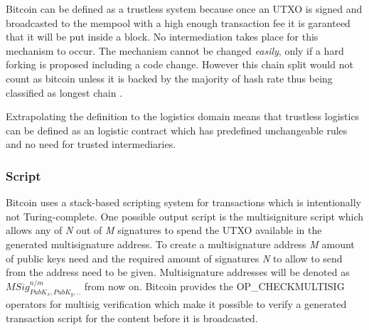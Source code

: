 Bitcoin can be defined as a trustless system because once an UTXO is signed and broadcasted to the mempool with a high enough transaction fee it is garanteed that it will be put inside a block. No intermediation takes place for this mechanism to occur. The mechanism cannot be changed \textit{easily}, only if a hard forking is proposed including a code change. However this chain split would not count as bitcoin unless it is backed by the majority of hash rate thus being classified as longest chain \cite{nakamoto2008bitcoin}. \par
Extrapolating the definition to the logistics domain means that trustless logistics can be defined as an logistic contract which has predefined unchangeable rules and no need for trusted intermediaries.

\subsubsection{Script}

Bitcoin uses a stack-based scripting system for transactions which is intentionally not Turing-complete. One possible output script is the multisigniture script which allows any of \textit{N} out of \textit{M} signatures to spend the UTXO available in the generated multisignature address. To create a multisignature address \textit{M} amount of public keys need and the required amount of signatures \textit{N} to allow to send from the address need to be given. Multisignature addresses will be denoted as \(MSig_{PubK_x, PubK_y, ..}^{n/m}\) from now on. Bitcoin provides the OP\_CHECKMULTISIG operators for multisig verification which make it possible to verify a generated transaction script for the content before it is broadcasted. \par


%

